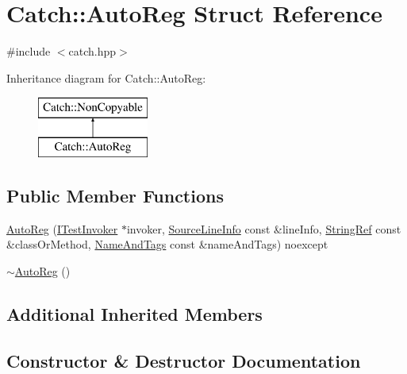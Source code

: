\hypertarget{struct_catch_1_1_auto_reg}{}\section{Catch\+:\+:Auto\+Reg Struct Reference}
\label{struct_catch_1_1_auto_reg}


{\ttfamily \#include $<$catch.\+hpp$>$}

Inheritance diagram for Catch\+:\+:Auto\+Reg\+:\begin{figure}[H]
\begin{center}
\leavevmode
\includegraphics[height=2.000000cm]{struct_catch_1_1_auto_reg}
\end{center}
\end{figure}
\subsection*{Public Member Functions}
\begin{DoxyCompactItemize}
\item 
\mbox{\hyperlink{struct_catch_1_1_auto_reg_a7eba02fb9d80b9896bf5a6517369af28}{Auto\+Reg}} (\mbox{\hyperlink{struct_catch_1_1_i_test_invoker}{I\+Test\+Invoker}} $\ast$invoker, \mbox{\hyperlink{struct_catch_1_1_source_line_info}{Source\+Line\+Info}} const \&line\+Info, \mbox{\hyperlink{class_catch_1_1_string_ref}{String\+Ref}} const \&class\+Or\+Method, \mbox{\hyperlink{struct_catch_1_1_name_and_tags}{Name\+And\+Tags}} const \&name\+And\+Tags) noexcept
\item 
\mbox{\hyperlink{struct_catch_1_1_auto_reg_a3cdb53f1e5ff115310f3372bebe198f1}{$\sim$\+Auto\+Reg}} ()
\end{DoxyCompactItemize}
\subsection*{Additional Inherited Members}


\subsection{Constructor \& Destructor Documentation}
\mbox{\label{struct_catch_1_1_auto_reg_a7eba02fb9d80b9896bf5a6517369af28}} 
